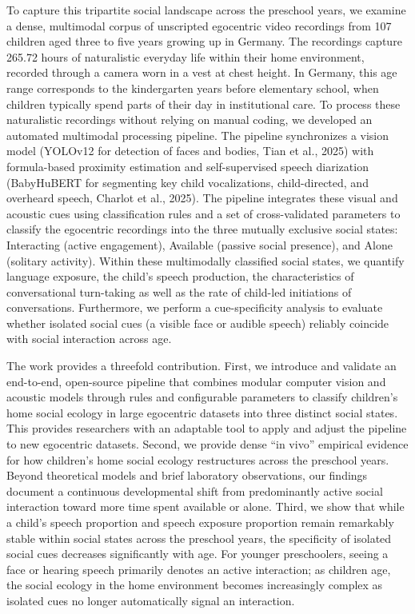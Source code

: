 \documentclass[
  english,
  12pt,
  man,floatsintext]{apa6}
\begin{document}
To capture this tripartite social landscape across the preschool years, we examine a dense, multimodal corpus of unscripted egocentric video recordings from 107 children aged three to five years growing up in Germany. The recordings capture 265.72 hours of naturalistic everyday life within their home environment, recorded through a camera worn in a vest at chest height. In Germany, this age range corresponds to the kindergarten years before elementary school, when children typically spend parts of their day in institutional care. To process these naturalistic recordings without relying on manual coding, we developed an automated multimodal processing pipeline. The pipeline synchronizes a vision model (YOLOv12 for detection of faces and bodies, Tian et al., 2025) with formula-based proximity estimation and self-supervised speech diarization (BabyHuBERT for segmenting key child vocalizations, child-directed, and overheard speech, Charlot et al., 2025). The pipeline integrates these visual and acoustic cues using classification rules and a set of cross-validated parameters to classify the egocentric recordings into the three mutually exclusive social states: Interacting (active engagement), Available (passive social presence), and Alone (solitary activity). Within these multimodally classified social states, we quantify language exposure, the child's speech production, the characteristics of conversational turn-taking as well as the rate of child-led initiations of conversations. Furthermore, we perform a cue-specificity analysis to evaluate whether isolated social cues (a visible face or audible speech) reliably coincide with social interaction across age.

The work provides a threefold contribution. First, we introduce and validate an end-to-end, open-source pipeline that combines modular computer vision and acoustic models through rules and configurable parameters to classify children's home social ecology in large egocentric datasets into three distinct social states. This provides researchers with an adaptable tool to apply and adjust the pipeline to new egocentric datasets. Second, we provide dense ``in vivo'' empirical evidence for how children's home social ecology restructures across the preschool years. Beyond theoretical models and brief laboratory observations, our findings document a continuous developmental shift from predominantly active social interaction toward more time spent available or alone. Third, we show that while a child's speech proportion and speech exposure proportion remain remarkably stable within social states across the preschool years, the specificity of isolated social cues decreases significantly with age. For younger preschoolers, seeing a face or hearing speech primarily denotes an active interaction; as children age, the social ecology in the home environment becomes increasingly complex as isolated cues no longer automatically signal an interaction.
\end{document}
